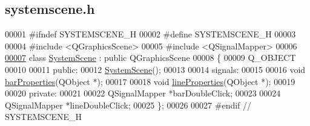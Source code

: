 \hypertarget{systemscene_8h_source}{}\subsection{systemscene.\+h}
\label{systemscene_8h_source}

\begin{DoxyCode}
00001 \textcolor{preprocessor}{#ifndef SYSTEMSCENE\_H}
00002 \textcolor{preprocessor}{#define SYSTEMSCENE\_H}
00003 
00004 \textcolor{preprocessor}{#include <QGraphicsScene>}
00005 \textcolor{preprocessor}{#include <QSignalMapper>}
00006 
\hypertarget{systemscene_8h_source_l00007}{}\hyperlink{class_system_scene}{00007} \textcolor{keyword}{class }\hyperlink{class_system_scene}{SystemScene} : \textcolor{keyword}{public} QGraphicsScene
00008 \{
00009   Q\_OBJECT
00010   
00011 \textcolor{keyword}{public}:
00012   \hyperlink{class_system_scene_af166acf8b3cc3a698ced208c303bc03d}{SystemScene}();
00013 
00014 signals:
00015 
00016   \textcolor{keywordtype}{void} \hyperlink{class_system_scene_aee42d6dbe1c5ba614db983855c64b867}{barProperties}(QObject *);
00017 
00018   \textcolor{keywordtype}{void} \hyperlink{class_system_scene_a1053da0c1a6498966267ec152b4850f3}{lineProperties}(QObject *);
00019 
00020 \textcolor{keyword}{private}:
00021 
00022   QSignalMapper *barDoubleClick;
00023 
00024   QSignalMapper *lineDoubleClick;
00025 \};
00026 
00027 \textcolor{preprocessor}{#endif // SYSTEMSCENE\_H}
\end{DoxyCode}
